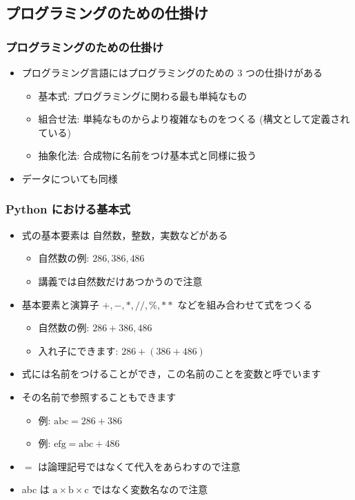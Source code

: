 \subsection{プログラミングのための仕掛け}
\begin{frame}[fragile]
\frametitle{プログラミングのための仕掛け}
  \begin{itemize}
\item プログラミング言語にはプログラミングのための 3 つの仕掛けがある
    \begin{itemize}
\item 基本式: プログラミングに関わる最も単純なもの
\item 組合せ法: 単純なものからより複雑なものをつくる (構文として定義されている)
\item 抽象化法: 合成物に名前をつけ基本式と同様に扱う
    \end{itemize}
\item データについても同様
  \end{itemize}
\end{frame}
\begin{frame}[fragile]
\frametitle{Python における基本式}
  \begin{itemize}
\item 式の基本要素は 自然数，整数，実数などがある
    \begin{itemize}
\item 自然数の例: \(286, 386, 486\) 
\item 講義では自然数だけあつかうので注意
    \end{itemize}
\item 基本要素と演算子 \(+, -, *, \slash\slash, \%, **\) などを組み合わせて式をつくる
    \begin{itemize}
\item 自然数の例: \(286+386, 486\) 
\item 入れ子にできます: \(286+(386+486)\) 
    \end{itemize}
\item 式には名前をつけることができ，この名前のことを変数と呼でいます
\item その名前で参照することもできます
    \begin{itemize}
\item 例: \(\mbox{abc}=286+386\) 
\item 例: \(\mbox{efg}=\mbox{abc}+486\) 
    \end{itemize}
\item $=$ は論理記号ではなくて代入をあらわすので注意
\item abc は \(\mbox{a}\times\mbox{b}\times\mbox{c}\) ではなく変数名なので注意
  \end{itemize}
\end{frame}
